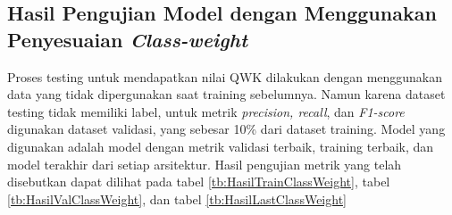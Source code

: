 \subsection{Hasil Pengujian Model dengan Menggunakan Penyesuaian \emph{Class-weight}}
\label{sec:412}
Proses testing untuk mendapatkan nilai QWK dilakukan dengan menggunakan data yang tidak dipergunakan saat training sebelumnya. Namun karena dataset testing tidak memiliki label, untuk metrik \emph{precision, recall}, dan \emph{F1-score} digunakan dataset validasi, yang sebesar 10\% dari dataset training. Model yang digunakan adalah model dengan metrik validasi terbaik, training terbaik, dan model terakhir dari setiap arsitektur.  Hasil pengujian metrik yang telah disebutkan dapat dilihat pada tabel \ref{tb:HasilTrainClassWeight}, tabel \ref{tb:HasilValClassWeight}, dan tabel \ref{tb:HasilLastClassWeight}
